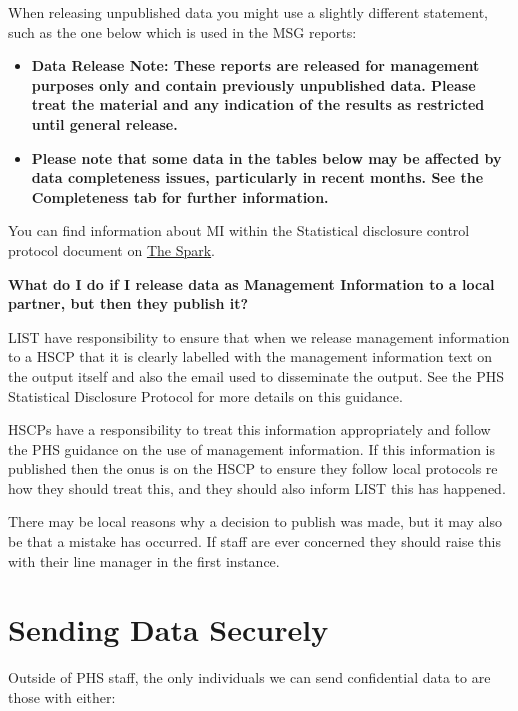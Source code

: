 \documentclass[
]{book}
\providecommand{\tightlist}{%
  \setlength{\itemsep}{0pt}\setlength{\parskip}{0pt}}
\begin{document}
When releasing unpublished data you might use a slightly different statement, such as the one below which is used in the MSG reports:

\begin{itemize}
\tightlist
\item
  \textbf{Data Release Note: These reports are released for management purposes only and contain previously unpublished data. Please treat the material and any indication of the results as restricted until general release.}
\item
  \textbf{Please note that some data in the tables below may be affected by data completeness issues, particularly in recent months. See the Completeness tab for further information.}
\end{itemize}

You can find information about MI within the Statistical disclosure control protocol document on \href{https://spark.publichealthscotland.org/downloads/statistical-disclosure-control-protocol/}{The Spark}.

\textbf{What do I do if I release data as Management Information to a local partner, but then they publish it?}

LIST have responsibility to ensure that when we release management information to a HSCP that it is clearly labelled with the management information text on the output itself and also the email used to disseminate the output. See the PHS Statistical Disclosure Protocol for more details on this guidance.

HSCPs have a responsibility to treat this information appropriately and follow the PHS guidance on the use of management information. If this information is published then the onus is on the HSCP to ensure they follow local protocols re how they should treat this, and they should also inform LIST this has happened.

There may be local reasons why a decision to publish was made, but it may also be that a mistake has occurred. If staff are ever concerned they should raise this with their line manager in the first instance.

\hypertarget{sending-data-securely}{%
\section{Sending Data Securely}\label{sending-data-securely}}

Outside of PHS staff, the only individuals we can send confidential data to are those with either:
\end{document}
